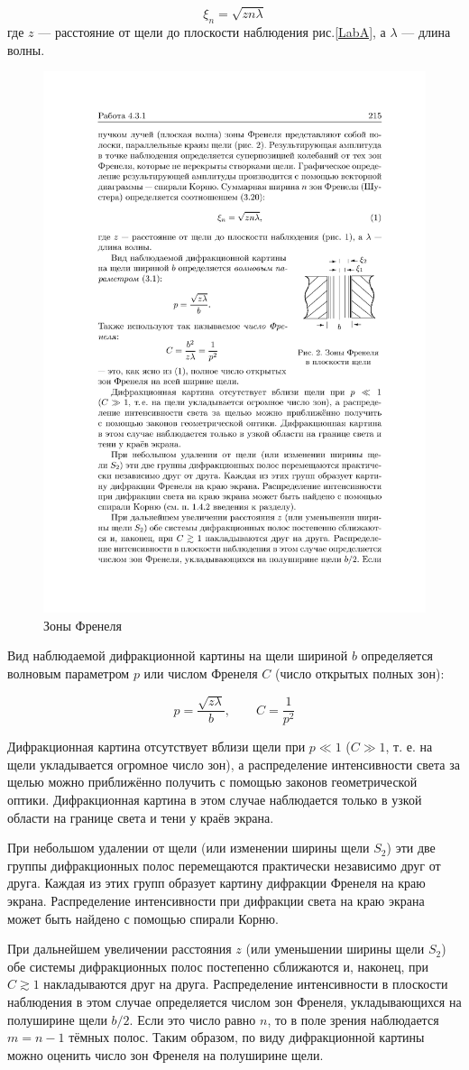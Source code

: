 \documentclass[a4paper, 12pt]{article}%
\begin{document}
	\begin{equation}\label{xin}
		\xi_n = \sqrt{zn\lambda}
	\end{equation}
	где $ z $ --- расстояние от щели до плоскости наблюдения рис.\ref{LabA}, а $ \lambda $ --- длина волны.
	
	\begin{figure}[H]
		\begin{center}
			\includegraphics[width=0.3\linewidth]{zone.pdf}
			\caption{Зоны Френеля}
			\label{zone}
		\end{center}
	\end{figure}

	
	Вид наблюдаемой дифракционной картины
	на щели шириной $ b $ определяется волновым параметром $ p $ или числом Френеля $ C $ (число открытых полных зон):
	
	
	\begin{equation}\label{}
		p = \dfrac{\sqrt{z \lambda}}{b}, \qquad C = \dfrac{1}{p^2}
	\end{equation}
	
	Дифракционная картина отсутствует вблизи щели при $ p \ll 1 $ ($ C \gg 1 $, т. е. на щели укладывается огромное число зон), а распределение интенсивности света за щелью можно приближённо получить с помощью законов геометрической оптики. Дифракционная картина в этом случае наблюдается только в узкой области на границе света и тени у краёв экрана.
	
	При небольшом удалении от щели (или изменении ширины щели $ S_2 $) эти две группы дифракционных полос перемещаются практически независимо друг от друга. Каждая из этих групп образует картину дифракции Френеля на краю экрана. Распределение интенсивности при дифракции света на краю экрана может быть найдено с помощью спирали Корню.
	
	При дальнейшем увеличении расстояния $ z $ (или уменьшении ширины щели $ S_2 $) обе системы дифракционных полос постепенно сближаются и, наконец, при $ C \gtrsim 1 $ накладываются друг на друга. Распределение интенсивности в плоскости наблюдения в этом случае определяется числом зон Френеля, укладывающихся на полуширине щели $ b/2 $. Если это число равно $ n $, то в поле зрения наблюдается $ m = n - 1 $ тёмных полос. Таким образом, по виду дифракционной картины можно оценить число зон Френеля на полуширине щели.   
	
\end{document}
